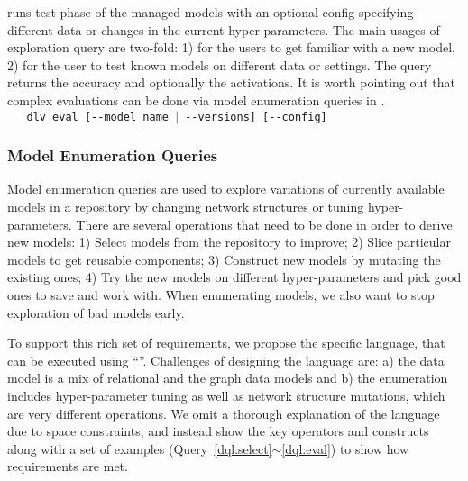 \documentclass[conference]{IEEEtran}
\begin{document}
 runs test phase of the managed models with an optional config
specifying different data or changes in the current hyper-parameters. The main usages of exploration
query are two-fold: 1) for the users to get familiar with a new model, 2) for the user
to test known models on different data or settings. The query returns the accuracy and optionally the activations. 
It is worth pointing out  that complex evaluations can be done via model enumeration queries in \DQL.%
\\{\small{\verb|   dlv eval [--model_name |\texttt{$\vert$}\verb| --versions] [--config]|}}




\subsubsection{Model Enumeration Queries}
\label{subsec:dql}
Model enumeration queries are used to explore variations of currently available models in a
repository by changing network structures or tuning hyper-parameters.
There are several operations that need to be done in order to derive new models: 1) Select
models from the repository to improve; 2) Slice particular models to get reusable components; 3)
Construct new models by mutating the existing ones; 4) Try the new models on different
hyper-parameters and pick good ones to save and work with. When enumerating models, we also want to
stop exploration of bad models early.


To support this rich set of requirements, %
we propose the \DQL\domain specific language, that can be executed using ``''. Challenges of designing the language are: a) the data model is a mix of relational and the graph data models and b) the enumeration includes hyper-parameter tuning as well as network structure mutations, which are very different operations. We omit a thorough explanation of the language due to space constraints, and instead show the key operators and constructs along with a set of examples (Query~\ref{dql:select}$\sim$\ref{dql:eval}) to show how requirements are met.
\end{document}
